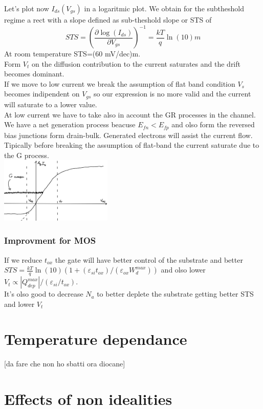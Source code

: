 Let's plot now $I_{ds}(V_{gs})$ in a logaritmic plot. We obtain for the subtheshold regime a rect with a slope defined as sub-theshold slope or STS of 
\begin{equation}
STS=\left(\frac{\partial \log(I_{ds})}{\partial V_{gs}}\right)^{-1}=\frac{kT}{q}\ln(10)m
\end{equation} 
At room temperature STS=(60 mV/dec)m.\\ 
Form $V_t$ on the diffusion contribution to the current saturates and the drift becomes dominant.\\
If we move to low current we break the assumption of flat band condition $V_s$ becomes indipendent on $V_{gs}$ so our expression is no more valid and the current will saturate to a lower value.\\
At low current we have to take also in account the GR processes in the channel. We have a net generation process beacuse $E_{fn}<E_{fp}$ and olso form the reversed bias junctions form drain-bulk. Generated electrons will assist the current flow. Tipically before breaking the assumption of flat-band the current saturate due to the G process.\\

\centering
\includegraphics[width=0.4\textwidth]{noisefloor.png}\\
\raggedright

\subsubsection{Improvment for MOS}
If we reduce $t_{ox}$ the gate will have better control of the substrate and better $STS=\frac{kT}{q}\ln(10)(1+(\varepsilon_{si}t_{ox})/(\varepsilon_{ox}W_d^{max}))$ and olso lower $V_t\propto|Q_{dep}^{max}|/(\varepsilon_{si}/t_{ox})$.\\
It's olso good to decrease $N_a$ to better deplete the substrate getting better STS and lower $V_t$

\section{Temperature dependance}
[da fare che non ho sbatti ora diocane]
\section{Effects of non idealities}

